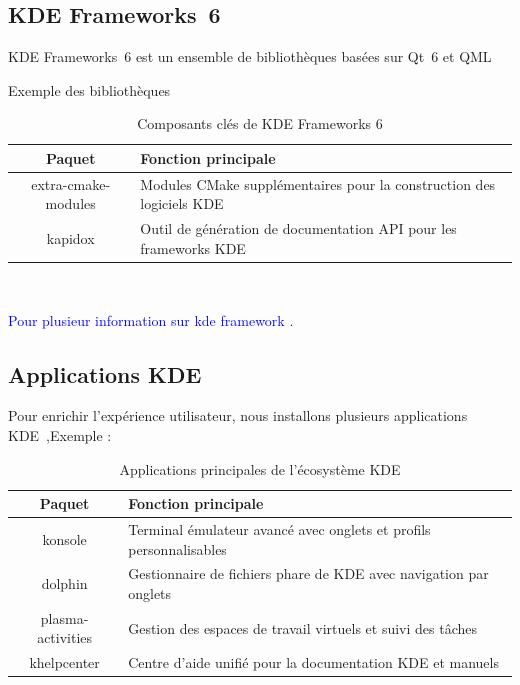 \subsection{KDE Frameworks 6}
\label{sssec:kf6}

KDE Frameworks 6 est un ensemble de bibliothèques basées sur Qt 6 et QML

Exemple des  bibliothèques


\begin{table}[H]
    \centering
    \begin{tabular}{|c|p{8cm}|}
        \hline
        \textbf{Paquet}  & \textbf{Fonction principale} \\
        \hline
       
        extra-cmake-modules  & Modules CMake supplémentaires pour la construction des logiciels KDE \\
        \hline
        kapidox  & Outil de génération de documentation API pour les frameworks KDE \\
        \hline
        
    \end{tabular}
    \caption{Composants clés de KDE Frameworks 6}\\
    \label{tab:kf6}
\end{table}

\textcolor{blue}{Pour plusieur information sur kde framework  \cite{framework_kde}}.\\

\subsection{Applications KDE}
\label{sssec:kde-apps}

Pour enrichir l’expérience utilisateur, nous installons plusieurs applications KDE ,Exemple :

\begin{table}[H]
    \centering
    \begin{tabular}{|c|p{8cm}|}
        \hline
        \textbf{Paquet} & \textbf{Fonction principale} \\
        \hline
        konsole  & Terminal émulateur avancé avec onglets et profils personnalisables \\
        \hline
        dolphin & Gestionnaire de fichiers phare de KDE avec navigation par onglets \\
        \hline
        plasma-activities  & Gestion des espaces de travail virtuels et suivi des tâches \\
        \hline
        khelpcenter  & Centre d'aide unifié pour la documentation KDE et manuels \\
        \hline
    \end{tabular}
    \caption{Applications principales de l'écosystème KDE}
    \label{tab:kde-apps}
\end{table}

